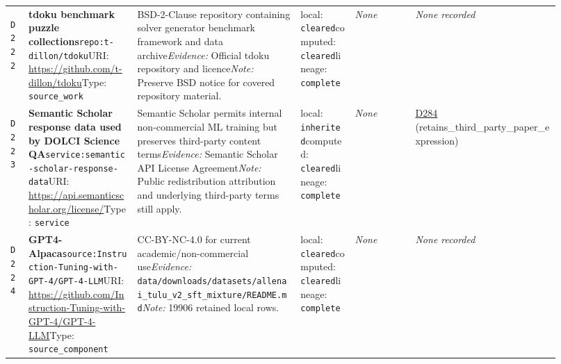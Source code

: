 \documentclass[9pt,a4paper]{article}
\newcommand{\depid}[1]{\hypertarget{dep:#1}{\texttt{#1}}}
\begin{document}
\begin{landscape}
\begin{longtable}{@{}L{0.035\linewidth}L{0.185\linewidth}L{0.27\linewidth}L{0.09\linewidth}L{0.10\linewidth}L{0.24\linewidth}@{}}
\depid{D222} & \textbf{tdoku benchmark puzzle collections}\newline \nolinkurl{repo:t-dillon/tdoku}\newline URI: \url{https://github.com/t-dillon/tdoku}\newline Type: \texttt{source\_work} & BSD-2-Clause repository containing solver generator benchmark framework and data archive\newline \textit{Evidence:} Official tdoku repository and licence\newline \textit{Note:} Preserve BSD notice for covered repository material. & local: \texttt{cleared}\newline computed: \texttt{cleared}\newline lineage: \texttt{complete} & \textit{None} & \textit{None recorded} \\
\depid{D223} & \textbf{Semantic Scholar response data used by DOLCI Science QA}\newline \nolinkurl{service:semantic-scholar-response-data}\newline URI: \url{https://api.semanticscholar.org/license/}\newline Type: \texttt{service} & Semantic Scholar permits internal non-commercial ML training but preserves third-party content terms\newline \textit{Evidence:} Semantic Scholar API License Agreement\newline \textit{Note:} Public redistribution attribution and underlying third-party terms still apply. & local: \texttt{inherited}\newline computed: \texttt{cleared}\newline lineage: \texttt{complete} & \textit{None} & \hyperlink{dep:D284}{D284} (retains\_third\_party\_paper\_expression) \\
\depid{D224} & \textbf{GPT4-Alpaca}\newline \nolinkurl{source:Instruction-Tuning-with-GPT-4/GPT-4-LLM}\newline URI: \url{https://github.com/Instruction-Tuning-with-GPT-4/GPT-4-LLM}\newline Type: \texttt{source\_component} & CC-BY-NC-4.0 for current academic/non-commercial use\newline \textit{Evidence:} \nolinkurl{data/downloads/datasets/allenai_tulu_v2_sft_mixture/README.md}\newline \textit{Note:} 19906 retained local rows. & local: \texttt{cleared}\newline computed: \texttt{cleared}\newline lineage: \texttt{complete} & \textit{None} & \textit{None recorded} \\

\end{longtable}
\end{landscape}
\end{document}
